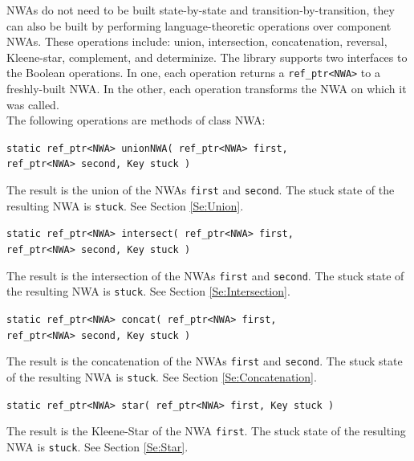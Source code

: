 \documentclass{llncs}
\begin{document}
NWAs do not need to be built state-by-state and transition-by-transition, they can also be built by performing language-theoretic operations over component NWAs. These operations include: union, intersection, concatenation, reversal, Kleene-star, complement, and determinize. The library supports two interfaces to the Boolean operations.  In one, each operation returns a \texttt{ref\_ptr<NWA>} to a freshly-built NWA.  In the other, each operation transforms the NWA on which it was called. \\

\noindent The following operations are methods of class NWA:

\begin{description}

  \item\texttt{static ref\_ptr<NWA> unionNWA( ref\_ptr<NWA> first, \\ \hspace*{3.25cm} ref\_ptr<NWA> second, Key stuck )} \nopagebreak

    The result is the union of the NWAs \texttt{first} and \texttt{second}.  The stuck state of the resulting NWA is \texttt{stuck}.  See Section \ref{Se:Union}.  

  \item\texttt{static ref\_ptr<NWA> intersect( ref\_ptr<NWA> first, \\ \hspace*{3.25cm} ref\_ptr<NWA> second, Key stuck )} \nopagebreak

    The result is the intersection of the NWAs \texttt{first} and \texttt{second}.  The stuck state of the resulting NWA is \texttt{stuck}.  See Section \ref{Se:Intersection}.

  \item\texttt{static ref\_ptr<NWA> concat( ref\_ptr<NWA> first, \\ \hspace*{3.25cm} ref\_ptr<NWA> second, Key stuck )} \nopagebreak

    The result is the concatenation of the NWAs \texttt{first} and \texttt{second}.  The stuck state of the resulting NWA is \texttt{stuck}.  See Section \ref{Se:Concatenation}.

  \item\texttt{static ref\_ptr<NWA> star( ref\_ptr<NWA> first, Key stuck )} \nopagebreak

    The result is the Kleene-Star of the NWA \texttt{first}.  The stuck state of the resulting NWA is \texttt{stuck}.  See Section \ref{Se:Star}.


\end{description}
\end{document}
